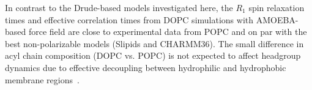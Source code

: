 \documentclass[journal=jctcce,manuscript=article,layout=singlecolumn]{achemso}
\begin{document}
In contrast to the Drude-based models investigated here, the $R_1$ spin relaxation times and effective correlation times from DOPC simulations with AMOEBA-based force field are close to experimental data from POPC and on par with the best non-polarizable models (Slipids and CHARMM36). The small difference in acyl chain composition (DOPC vs. POPC) is not expected to  affect headgroup dynamics due to effective decoupling between hydrophilic and hydrophobic membrane regions~\cite{Antila2022rot, Klauda08}.

\end{document}
